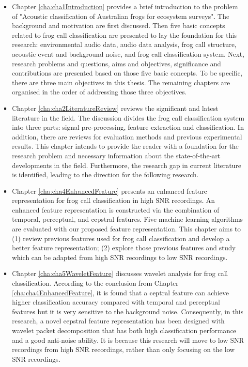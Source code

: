 \begin{itemize}
\item  Chapter \ref{cha:cha1Introduction} provides a brief introduction to the problem of "Acoustic classification of Australian frogs for ecosystem surveys". The background and motivation are first discussed. Then five basic concepts related to frog call classification are presented to lay the foundation for this research: environmental audio data, audio data analysis, frog call structure, acoustic event and background noise, and frog call classification system. Next, research problems and questions, aims and objectives, significance and contributions are presented based on those five basic concepts. To be specific, there are three main objectives in this thesis. The remaining chapters are organised in the order of addressing those three objectives.

\item Chapter \ref{cha:cha2LiteratureReview} reviews the significant and latest literature in the field. The discussion divides the frog call classification system into three parts: signal pre-processing, feature extraction and classification. In addition, there are reviews for evaluation methods and previous experimental results. This chapter intends to provide the reader with a foundation for the research problem and necessary information about the state-of-the-art developments in the field. Furthermore, the research gap in current literature is identified, leading to the direction for the following research.


\item Chapter \ref{cha:cha4EnhancedFeature} presents an enhanced feature representation for frog call classification in high SNR recordings. An enhanced feature representation is constructed via the combination of temporal, perceptual, and cepstral features. Five machine learning algorithms are evaluated with our proposed feature representation. This chapter aims to (1) review previous features used for frog call classification and develop a better feature representation; (2) explore those previous features and study which can be adapted from high SNR recordings to low SNR recordings.


\item  Chapter \ref{cha:cha5WaveletFeature} discusses wavelet analysis for frog call classification. According to the conclusion from Chapter \ref{cha:cha4EnhancedFeature}, it is found that a ceptral feature can achieve higher classification accuracy compared with temporal and perceptual features but it is very sensitive to the background noise. Consequently, in this research, a novel cepstral feature representation has been designed with wavelet packet decomposition that has both high classification performance and a good anti-noise ability. It is because this research will move to low SNR recordings from high SNR recordings, rather than only focusing on the low SNR recordings.



\end{itemize}
